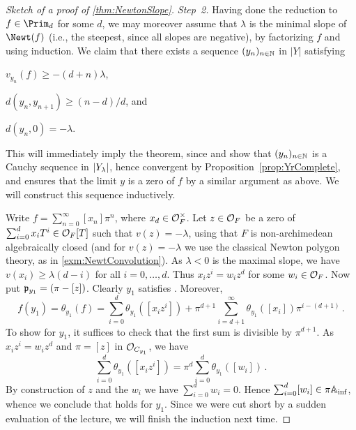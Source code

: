 \documentclass[a4paper, 10pt, oneside, DIV=9, chapterprefix=true, numbers=enddot,bibliography=totoc]{scrbook}
\begin{document}
\begin{proof}[Sketch of a proof of \cref{thm:NewtonSlope}]
	\emph{Step~2.} Having done the reduction to $f\in\Prim_d$ for some $d$, we may moreover assume that $\lambda$ is the minimal slope of $\Newt(f)$ (i.e., the steepest, since all slopes are negative), by factorizing $f$ and using induction. We claim that there exists a sequence $(y_n)_{n\in\mathbb{N}}$ in $|Y|$ satisfying
	\begin{alphanumerate}
		\item $v_{y_n}(f)\geq -(d+n)\lambda$,
		\item $d(y_n,y_{n+1})\geq (n-d)/d$, and
		\item $d(y_n,0)=-\lambda$.
	\end{alphanumerate}
	This will immediately imply the theorem, since  and  show that $(y_n)_{n\in\mathbb{N}}$ is a Cauchy sequence in $|Y_{\-\lambda}|$, hence convergent by Proposition~\cref{prop:YrComplete}, and  ensures that the limit $y$ is a zero of $f$ by a similar argument as above. We will construct this sequence inductively.
	
	Write $f= \sum_{n=0}^\infty[x_n]\pi^n$, where $x_d\in\mathcal{O}_F^\times$. Let $z\in\mathcal{O}_F$ be a zero of $\sum_{i=0}^dx_iT^i\in\mathcal{O}_F[T]$ such that $v(z)=-\lambda$, using that $F$ is non-archimedean algebraically closed (and for $v(z)=-\lambda$ we use the classical Newton polygon theory, as in \cref{exm:NewtConvolution}). As $\lambda <0$ is the maximal slope, we have $v(x_i)\geq \lambda(d-i)$ for all $i=0,\dotsc,d$. Thus $x_iz^i=w_iz^d$ for some $w_i\in\mathcal{O}_F$. Now put $\mathfrak{p}_{y_1}=(\pi-[z])$. Clearly $y_1$ satisfies . Moreover,
	\begin{equation*}
		f(y_1)=\theta_{y_1}(f)=\sum_{i=0}^d\theta_{y_1}([x_iz^i])+\pi^{d+1}\sum_{i=d+1}^\infty\theta_{y_1}([x_i])\pi^{i-(d+1)}\,.
	\end{equation*}
	To show  for $y_1$, it suffices to check that the first sum is divisible by $\pi^{d+1}$. As $x_iz^i=w_iz^d$ and $\pi=[z]$ in $\mathcal{O}_{C_{y_1}}$, we have
	\begin{equation*}
		\sum_{i=0}^d\theta_{y_1}([x_iz^i])=\pi^d\sum_{i=0}^d\theta_{y_1}([w_i])\,.
	\end{equation*}
	By construction of $z$ and the $w_i$ we have $\sum_{i=0}^dw_i=0$. Hence $\sum_{i=0}^d[w_i]\in\pi\mathbb{A}_{\mathrm{inf}}$, whence we conclude that  holds for $y_1$. Since we were cut short by a sudden evaluation of the lecture, we will finish the induction next time.
\end{proof}

\appendix
\backmatter{}
\printbibliography
\end{document}
